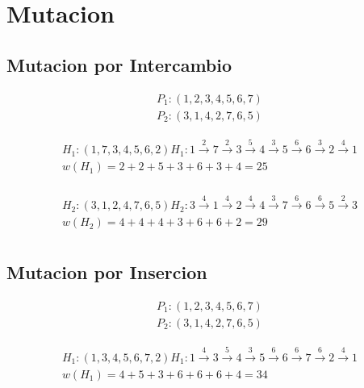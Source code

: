\documentclass{article}
\begin{document}
\section{Mutacion}
\subsection{Mutacion por Intercambio}
\begin{equation*}
  \begin{split}
    P_1: (1,\boxed{2},3,4,5,6,\boxed{7})\\
    P_2: (3,1,\boxed{4},\boxed{2},7,6,5)
  \end{split}
\end{equation*}

\begin{equation*}
  \begin{split}
    H_1: (1,7,3,4,5,6,2) H_1: 1 \overset{2}{\rightarrow} 7 \overset{2}{\rightarrow} 3 \overset{5}{\rightarrow} 4 \overset{3}{\rightarrow} 5 \overset{6}{\rightarrow} 6 \overset{3}{\rightarrow} 2 \overset{4}{\rightarrow} 1\\
    w(H_1) = 2 + 2 + 5 + 3 + 6 + 3 + 4 = 25\\
  \end{split}
\end{equation*}

\begin{equation*}
  \begin{split}
    H_2: (3,1,2,4,7,6,5) H_2: 3 \overset{4}{\rightarrow} 1 \overset{4}{\rightarrow} 2 \overset{4}{\rightarrow} 4 \overset{3}{\rightarrow} 7 \overset{6}{\rightarrow} 6 \overset{6}{\rightarrow} 5 \overset{2}{\rightarrow} 3\\
    w(H_2) = 4 + 4 + 4 + 3 + 6 + 6 + 2 = 29\\
  \end{split}
\end{equation*}

\subsection{Mutacion por Insercion}
\begin{equation*}
  \begin{split}
    P_1: (1,\boxed{2},3,4,5,6,\boxed{7})\\
    P_2: (3,1,\boxed{4},\boxed{2},7,6,5)
  \end{split}
\end{equation*}

\begin{equation*}
  \begin{split}
    H_1: (1,3,4,5,6,7,2) H_1: 1 \overset{4}{\rightarrow} 3 \overset{5}{\rightarrow} 4 \overset{3}{\rightarrow} 5 \overset{6}{\rightarrow} 6 \overset{6}{\rightarrow} 7 \overset{6}{\rightarrow} 2 \overset{4}{\rightarrow} 1\\
    w(H_1) = 4 + 5 + 3 + 6 + 6 + 6 + 4 = 34\\
  \end{split}
\end{equation*}
\end{document}
